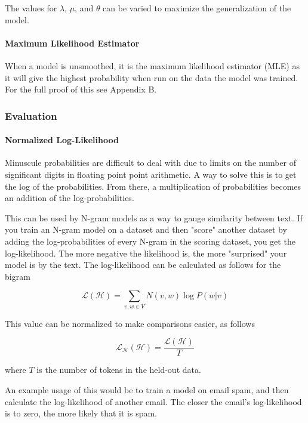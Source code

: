 \documentclass[11pt]{article}
\begin{document}
The values for $\lambda$, $\mu$, and $\theta$ can be varied to maximize the generalization of the model.

\paragraph{Maximum Likelihood Estimator}

When a model is unsmoothed, it is the maximum likelihood estimator (MLE) as it will give the highest probability when run on the data the model was trained. For the full proof of this see Appendix B.

\subsubsection{Evaluation}

\paragraph{Normalized Log-Likelihood}

Minuscule probabilities are difficult to deal with due to limits on the number of significant digits in floating point point arithmetic. A way to solve this is to get the log of the probabilities. From there, a multiplication of probabilities becomes an addition of the log-probabilities.

This can be used by N-gram models as a way to gauge similarity between text. If you train an N-gram model on a dataset and then "score" another dataset by adding the log-probabilities of every N-gram in the scoring dataset, you get the log-likelihood. The more negative the likelihood is, the more "surprised" your model is by the text. The log-likelihood can be calculated as follows for the bigram

$$ \mathcal{L}\left(\mathcal{H}\right) = \sum\limits_{v, w \in V} N\left(v, w \right) \log P\left(w \vert v \right) $$

This value can be normalized to make comparisons easier, as follows

$$ \mathcal{L}_\mathcal{N}\left(\mathcal{H}\right) = \frac{ \mathcal{L}\left(\mathcal{H}\right) }{T} $$

where $T$ is the number of tokens in the held-out data.

An example usage of this would be to train a model on email spam, and then calculate the log-likelihood of another email. The closer the email's log-likelihood is to zero, the more likely that it is spam.
\end{document}
